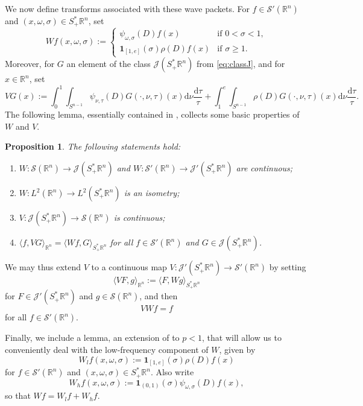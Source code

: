 \documentclass{amsart}
\newcommand {\ud}{\mathrm{d}}
\newcommand {\ind}{\mathbf{1}}
\newcommand {\J}{\mathcal{J}}
\newcommand {\rb}{\rangle}
\newcommand {\lb}{\langle}
\newcommand {\Rn}{\mathbb{R}^{n}}
\newcommand {\Spp}{S^{*}_{+}\Rn}
\newcommand {\Sw}{\mathcal{S}}
\newcommand {\w}{\omega}
\newtheorem{proposition}[theorem]{Proposition}
\theoremstyle{definition}
\numberwithin{equation}{section}
\begin{document}
We now define transforms associated with these wave packets. For $f\in \Sw'(\Rn)$ and $(x,\w,\sigma)\in\Spp$, set
\begin{equation}\label{eq:defW}
Wf(x,\w,\sigma):=\begin{cases}\psi_{\w,\sigma}(D)f(x)&\text{if }0<\sigma<1,\\
\ind_{[1,e]}(\sigma)\rho(D)f(x)&\text{if }\sigma\geq1.\end{cases}
\end{equation}
Moreover, for $G$ an element of the class $\J(\Spp)$ from \eqref{eq:classJ}, and for $x\in\Rn$, set
\[
VG(x):=\int_{0}^{1}\int_{S^{n-1}}\psi_{\nu,\tau}(D)G(\cdot,\nu,\tau)(x)\ud\nu\frac{\ud\tau}{\tau}+\int_{1}^{e}\int_{S^{n-1}}\rho(D)G(\cdot,\nu,\tau)(x)\ud \nu\frac{\ud\tau}{\tau}.
\]
The following lemma, essentially contained in \cite[Proposition 4.3]{HaPoRo20}, collects some basic properties of $W$ and $V$.

\begin{proposition}\label{prop:transforms}
The following statements hold:
\begin{enumerate}
\item\label{it:transforms1} $W:\Sw(\Rn)\to \J(\Spp)$ and $W:\Sw'(\Rn)\to \J'(\Spp)$ are continuous;
\item\label{it:transforms2} $W:L^{2}(\Rn)\to L^{2}(\Spp)$ is an isometry;
\item\label{it:transforms3} $V:\J(\Spp)\to \Sw(\Rn)$ is continuous;
\item\label{it:transforms4} $\lb f,VG\rb_{\Rn}=\lb Wf,G\rb_{\Spp}$ for all $f\in\Sw'(\Rn)$ and $G\in\J(\Spp)$. %
\end{enumerate}
\end{proposition}

We may thus extend $V$ to a continuous map $V:\J'(\Spp)\to\Sw'(\Rn)$ by setting
\[
\lb VF,g\rb_{\Rn}:=\lb F,Wg\rb_{\Spp}
\]
for $F\in\J'(\Spp)$ and $g\in\Sw(\Rn)$, and then \begin{equation}\label{eq:repro}
VWf=f
\end{equation}
for all $f\in\Sw'(\Rn)$.

Finally, we include a lemma, an extension of \cite[Lemma A.1]{HaPoRo20} to $p<1$, that will allow us to conveniently deal with the low-frequency component of $W$, given by
\begin{equation}\label{eq:defWl}
W_{l}f(x,\w,\sigma):=\ind_{[1,e]}(\sigma)\rho(D)f(x)
\end{equation}
for $f\in\Sw'(\Rn)$ and $(x,\w,\sigma)\in\Spp$. Also write
\begin{equation}\label{eq:defWh}
W_{h}f(x,\w,\sigma):=\ind_{(0,1)}(\sigma)\psi_{\w,\sigma}(D)f(x),
\end{equation}
so that $Wf=W_{l}f+W_{h}f$.
\end{document}
